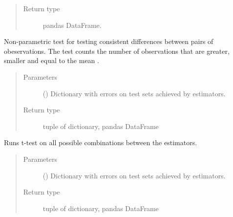 \documentclass[letterpaper,10pt,english]{sphinxmanual}
\begin{document}
\begin{fulllineitems}
\begin{fulllineitems}
\begin{quote}
\begin{description}
\item[{Return type}] \leavevmode
pandas DataFrame.

\end{description}\end{quote}

\end{fulllineitems}


\begin{fulllineitems}
\label{\detokenize{analyze_results:mleap.analyze_results.analyze_results.AnalyseResults.sign_test}}
Non-parametric test for testing consistent differences between pairs of obeservations.
The test counts the number of observations that are greater, smaller and equal to the mean
.
\begin{quote}\begin{description}
\item[{Parameters}] \leavevmode
{} () \textendash{} Dictionary with errors on test sets achieved by estimators.

\item[{Return type}] \leavevmode
tuple of dictionary, pandas DataFrame

\end{description}\end{quote}

\end{fulllineitems}


\begin{fulllineitems}
\label{\detokenize{analyze_results:mleap.analyze_results.analyze_results.AnalyseResults.t_test}}
Runs t-test on all possible combinations between the estimators.
\begin{quote}\begin{description}
\item[{Parameters}] \leavevmode
{} () \textendash{} Dictionary with errors on test sets achieved by estimators.

\item[{Return type}] \leavevmode
tuple of dictionary, pandas DataFrame


\end{description}
\end{quote}
\end{fulllineitems}
\end{fulllineitems}
\end{document}
